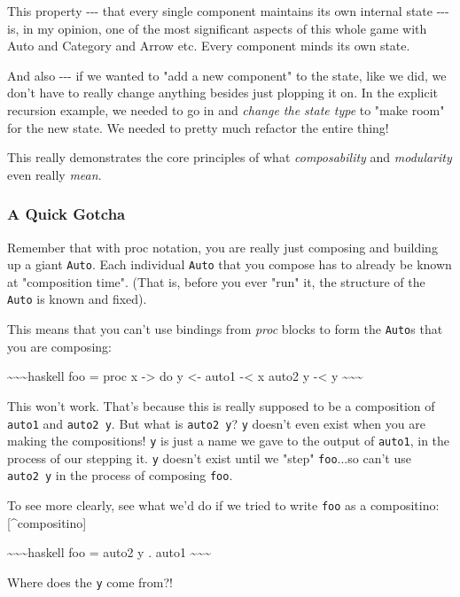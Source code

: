 \documentclass[]{article}
\begin{document}
This property -\/-\/- that every single component maintains its own internal
state -\/-\/- is, in my opinion, one of the most significant aspects of this
whole game with Auto and Category and Arrow etc. Every component minds its own
state.

And also -\/-\/- if we wanted to "add a new component" to the state, like we
did, we don't have to really change anything besides just plopping it on. In the
explicit recursion example, we needed to go in and \emph{change the state type}
to "make room" for the new state. We needed to pretty much refactor the entire
thing!

This really demonstrates the core principles of what \emph{composability} and
\emph{modularity} even really \emph{mean}.

\subsubsection{A Quick Gotcha}

Remember that with proc notation, you are really just composing and building up
a giant \texttt{Auto}. Each individual \texttt{Auto} that you compose has to
already be known at "composition time". (That is, before you ever "run" it, the
structure of the \texttt{Auto} is known and fixed).

This means that you can't use bindings from \emph{proc} blocks to form the
\texttt{Auto}s that you are composing:

\textasciitilde{}\textasciitilde{}\textasciitilde{}haskell foo = proc x
-\textgreater{} do y \textless{}- auto1 -\textless{} x auto2 y -\textless{} y
\textasciitilde{}\textasciitilde{}\textasciitilde{}

This won't work. That's because this is really supposed to be a composition of
\texttt{auto1} and \texttt{auto2\ y}. But what is \texttt{auto2\ y}? \texttt{y}
doesn't even exist when you are making the compositions! \texttt{y} is just a
name we gave to the output of \texttt{auto1}, in the process of our stepping it.
\texttt{y} doesn't exist until we "step" \texttt{foo}...so can't use
\texttt{auto2\ y} in the process of composing \texttt{foo}.

To see more clearly, see what we'd do if we tried to write \texttt{foo} as a
compositino:{[}\^{}compositino{]}

\textasciitilde{}\textasciitilde{}\textasciitilde{}haskell foo = auto2 y . auto1
\textasciitilde{}\textasciitilde{}\textasciitilde{}

Where does the \texttt{y} come from?!
\end{document}
